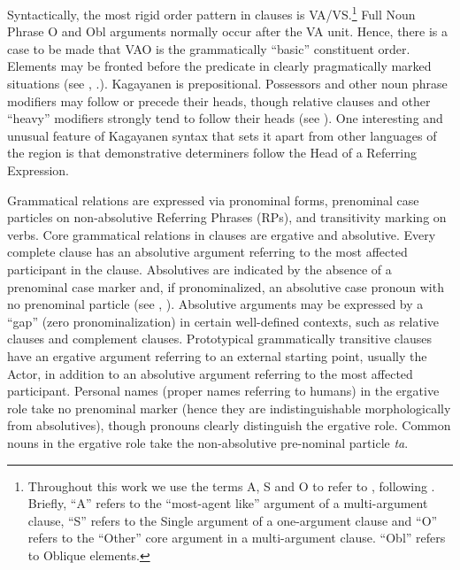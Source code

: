Syntactically, the most rigid order pattern in clauses is VA/VS.\footnote{Throughout this work we use the terms A, S and O to refer to , following \citet{dixon1979, dixon1994}. Briefly, “A” refers to the “most-agent like” argument of a multi-argument clause, “S” refers to the Single argument of a one-argument clause and “O” refers to the “Other” core argument in a multi-argument clause. “Obl” refers to Oblique elements.}  Full Noun Phrase O and Obl arguments normally occur after the VA unit. Hence, there is a case to be made that VAO is the grammatically “basic” constituent order. Elements may be fronted before the predicate in clearly pragmatically marked situations (see , .). Kagayanen is prepositional. Possessors and other noun phrase modifiers may follow or precede their heads, though relative clauses and other “heavy” modifiers strongly tend to follow their heads (see ). One interesting and unusual feature of Kagayanen syntax that sets it apart from other languages of the region is that demonstrative determiners follow the Head of a Referring Expression.

Grammatical relations are expressed via pronominal forms, prenominal case particles on non-absolutive Referring Phrases (RPs), and transitivity marking on verbs. Core grammatical relations in clauses are ergative and absolutive. Every complete clause has an absolutive argument referring to the most affected participant in the clause. Absolutives are indicated by the absence of a prenominal case marker and, if pronominalized, an absolutive case pronoun with no prenominal particle (see , ). Absolutive arguments may be expressed by a “gap” (zero pronominalization) in certain well-defined contexts, such as relative clauses and complement clauses. Prototypical grammatically transitive clauses have an ergative argument referring to an external starting point, usually the Actor, in addition to an absolutive argument referring to the most affected participant. Personal names (proper names referring to humans) in the ergative role take no prenominal marker (hence they are indistinguishable morphologically from absolutives), though pronouns clearly distinguish the ergative role. Common nouns in the ergative role take the non-absolutive pre-nominal particle \textit{ta}.
